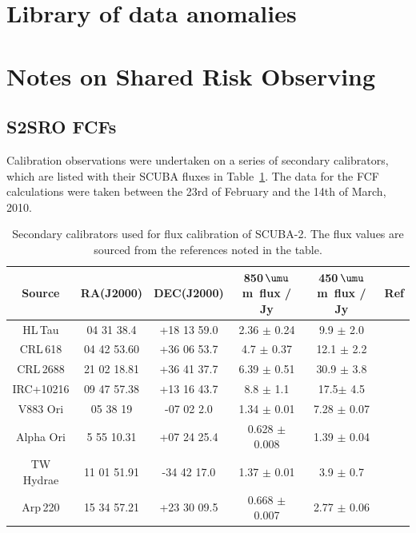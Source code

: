 \documentclass[twoside,11pt]{article}
\newcommand{\micron}{\mbox{\,${\umu}$m}}            %
\renewcommand{\_}{\texttt{\symbol{95}}}
\begin{document}
\appendix

\section{Library of data anomalies}

\section{Notes on Shared Risk Observing}

\subsection{S2SRO FCFs}

Calibration observations were undertaken on a series of secondary
calibrators, which are listed with their SCUBA fluxes in
Table~\ref{tab1}. The data for the FCF calculations were taken between
the 23rd of February and the 14th of March, 2010.

\begin{table}[h]
\caption{Secondary calibrators used for flux calibration of SCUBA-2.
  The flux values are sourced from the references noted in the table. }
\label{tab1}
\begin{center}
\begin{tabular}{|c|c|c|c|c|c|}

\hline
\rule[-1ex]{0pt}{3.5ex} Source & RA(J2000) & DEC(J2000) & 850\micron\
flux / Jy & 450\micron\ flux / Jy & Ref  \\
\hline
\rule[-1ex]{0pt}{3.5ex} HL\,Tau & 04 31 38.4 & +18 13 59.0 & 2.36 $\pm$ 0.24     & 9.9 $\pm$ 2.0 & \cite{flux1}\\
\hline
\rule[-1ex]{0pt}{3.5ex} CRL\,618	& 04 42 53.60 & +36 06 53.7 & 4.7  $\pm$ 0.37   & 12.1 $\pm$ 2.2 & \cite{flux1} \\
\hline
\rule[-1ex]{0pt}{3.5ex} CRL\,2688 & 21 02 18.81 & +36 41 37.7 & 6.39  $\pm$ 0.51  & 30.9 $\pm$ 3.8 & \cite{flux1} \\
\hline
\rule[-1ex]{0pt}{3.5ex} IRC+10216 & 09 47 57.38 & +13 16 43.7 & 8.8  $\pm$ 1.1  & 17.5$\pm$ 4.5 & \cite{flux1} \\
\hline
\rule[-1ex]{0pt}{3.5ex} V883 Ori &  05 38 19  & -07 02 2.0 & 1.34 $\pm$ 0.01     & 7.28 $\pm$ 0.07 & \cite{flux2}   \\
\hline
\rule[-1ex]{0pt}{3.5ex} Alpha Ori & 5 55 10.31 & +07 24 25.4 & 0.628 $\pm$ 0.008  & 1.39 $\pm$ 0.04 & \cite{flux2}  \\
\hline
\rule[-1ex]{0pt}{3.5ex} TW Hydrae & 11 01 51.91 & -34 42 17.0 & 1.37 $\pm$ 0.01 & 3.9 $\pm$ 0.7 & \cite{flux2}  \\
\hline
\rule[-1ex]{0pt}{3.5ex} Arp\,220 & 15 34 57.21 & +23 30 09.5 & 0.668 $\pm$ 0.007  & 2.77 $\pm$ 0.06 & \cite{flux2} \\
\hline

\end{tabular}
\end{center}
\end{table}
\end{document}
